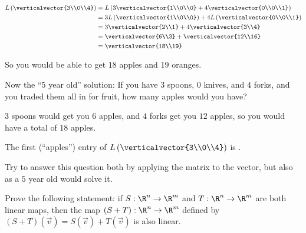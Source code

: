 \documentclass{ximera}
\begin{document}
\begin{question}
  \begin{solution}
  \begin{hint}
  		\begin{align}
  		L\left(\verticalvector{3\\0\\4}\right) & = L\left(3 \verticalvector{1\\0\\0}+4\verticalvector{0\\0\\1}\right)\\
  		&= 3L\left(\verticalvector{1\\0\\0}\right)+4L\left(\verticalvector{0\\0\\1}\right)\\
  		&=3\verticalvector{2\\1}+4\verticalvector{3\\4}\\
  		&=\verticalvector{6\\3}+\verticalvector{12\\16}\\
  		&=\verticalvector{18\\19}
  		\end{align}
  		
  		So you would be able to get $18$ apples and $19$ oranges.
  \end{hint}
  \begin{hint}
  	Now the ``5 year old'' solution: If you have $3$ spoons, $0$ knives, and $4$ forks, and you traded them all in for fruit, how many apples would you have?
  \end{hint}
  \begin{hint}
  	$3$ spoons would get you $6$ apples, and $4$ forks get you $12$ apples, so you would have a total of $18$ apples.
  \end{hint}
    The first (``apples'') entry of $L\left(\verticalvector{3\\0\\4}\right)$ is .

    Try to answer this question both by applying the matrix to the
    vector, but also as a $5$ year old would solve it.
  \end{solution}
\end{question} 

Prove the following statement: if $S:\R^n \to\R^m$ and $T:\R^n \to \R^m$ are both linear maps, 
then the map $(S+T):\R^n \to\R^m$ defined by $(S+T)(\vec{v}) = S(\vec{v})+T(\vec{v})$ is also linear.
\end{document}
